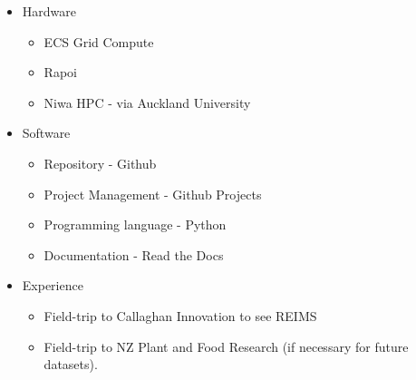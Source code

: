 \documentclass[11pt, a4paper, twoside, openright]{report}
\begin{document}
\begin{itemize}
  \item Hardware 
  \begin{itemize}
    \item ECS Grid Compute 
    \item Rapoi 
    \item Niwa HPC - via Auckland University
  \end{itemize}
  \item Software 
  \begin{itemize}
    \item Repository - Github 
    \item Project Management - Github Projects 
    \item Programming language - Python
    \item Documentation - Read the Docs  
  \end{itemize}
  \item Experience 
  \begin{itemize}
    \item Field-trip to Callaghan Innovation to see REIMS 
    \item Field-trip to NZ Plant and Food Research (if necessary for future datasets). 
  \end{itemize}
\end{itemize}

\backmatter

%


\end{document}
